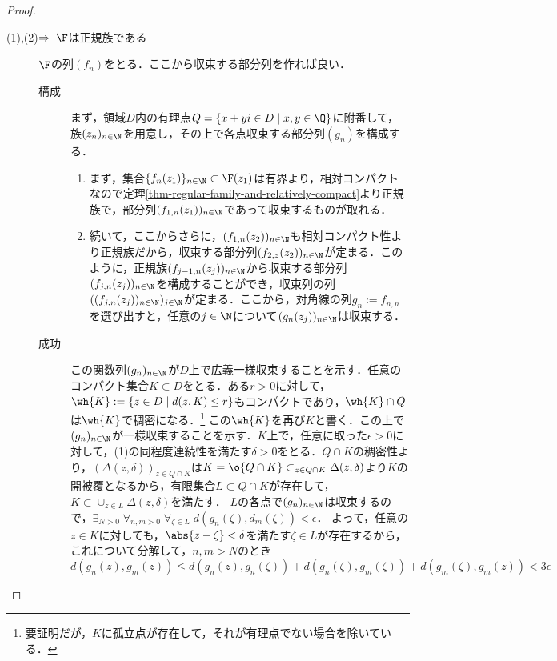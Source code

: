 \documentclass[uplatex, dvipdfmx]{jsreport}
\begin{document}
\begin{proof}\mbox{}
    \begin{description}
        \item[(1),(2)$\Rightarrow\;\F$は正規族である]
        $\F$の列$(f_n)$をとる．ここから収束する部分列を作れば良い．
        \begin{description}
            \item[構成] まず，領域$D$内の有理点$Q=\{x+yi\in D\mid x,y\in\Q\}$に附番して，族$(z_n)_{n\in\N}$を用意し，その上で各点収束する部分列$(g_n)$を構成する．
            \begin{enumerate}
                \item まず，集合$\{f_n(z_1)\}_{n\in\N}\subset\F(z_1)$は有界より，相対コンパクトなので定理\ref{thm-regular-family-and-relatively-compact}より正規族で，部分列$(f_{1,n}(z_1))_{n\in\N}$であって収束するものが取れる．
                \item 続いて，ここからさらに，$(f_{1,n}(z_2))_{n\in\N}$も相対コンパクト性より正規族だから，収束する部分列$(f_{2,z}(z_2))_{n\in\N}$が定まる．このように，正規族$(f_{j-1,n}(z_j))_{n\in\N}$から収束する部分列$(f_{j,n}(z_j))_{n\in\N}$を構成することができ，収束列の列$((f_{j,n}(z_j))_{n\in\N})_{j\in\N}$が定まる．ここから，対角線の列$g_n:=f_{n,n}$を選び出すと，任意の$j\in\N$について$(g_n(z_j))_{n\in\N}$は収束する．
            \end{enumerate}
            \item[成功]
            この関数列$(g_n)_{n\in\N}$が$D$上で広義一様収束することを示す．任意のコンパクト集合$K\subset D$をとる．ある$r>0$に対して，$\wh{K}:=\{z\in D\mid d(z,K)\le r\}$もコンパクトであり，$\wh{K}\cap Q$は$\wh{K}$で稠密になる．\footnote{要証明だが，$K$に孤立点が存在して，それが有理点でない場合を除いている．}
            この$\wh{K}$を再び$K$と書く．この上で$(g_n)_{n\in\N}$が一様収束することを示す．$K$上で，任意に取った$\epsilon>0$に対して，(1)の同程度連続性を満たす$\delta>0$をとる．$Q\cap K$の稠密性より，$(\Delta(z,\delta))_{z\in Q\cap K}$は$K=\o{Q\cap K}\subset_{z\in Q\cap K}\Delta(z,\delta)$より$K$の開被覆となるから，有限集合$L\subset Q\cap K$が存在して，$K\subset\cup_{z\in L}\Delta(z,\delta)$を満たす．
            $L$の各点で$(g_n)_{n\in\N}$は収束するので，$\exists_{N>0}\;\forall_{n,m>0}\;\forall_{\zeta\in L}\;d(g_n(\zeta),d_m(\zeta))<\epsilon$．
            よって，任意の$z\in K$に対しても，$\abs{z-\zeta}<\delta$を満たす$\zeta\in L$が存在するから，これについて分解して，$n,m>N$のとき
            \[d(g_n(z),g_m(z))\le d(g_n(z),g_n(\zeta))+d(g_n(\zeta),g_m(\zeta))+d(g_m(\zeta),g_m(z))<3\epsilon\]

\end{description}
\end{description}
\end{proof}
\end{document}
